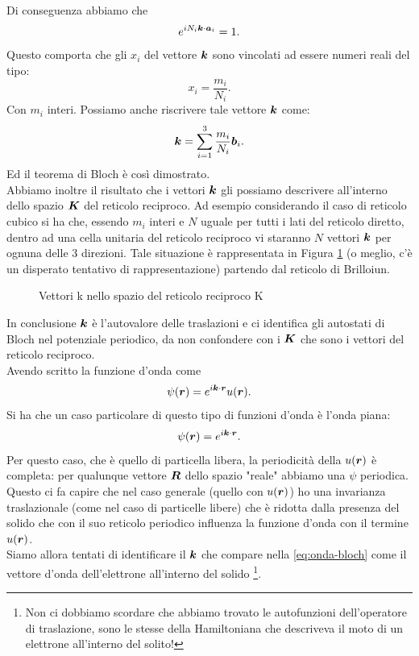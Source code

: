 Di conseguenza abbiamo che 
\[
	e^{iN_i\boldsymbol{k}\cdot\boldsymbol{a}_i}=1 
.\] 
Questo comporta che gli $x_i$ del vettore $\boldsymbol{k}$ sono vincolati ad essere numeri reali del tipo:
\[
	x_i = \frac{m_i}{N_i}
.\] 
Con $m_i$ interi. Possiamo anche riscrivere tale vettore $\boldsymbol{k}$ come:
\[
	\boldsymbol{k}=\sum_{i=1}^{3} \frac{m_i}{N_i}\boldsymbol{b}_i
.\] 
Ed il teorema di Bloch è così dimostrato.\\
Abbiamo inoltre il risultato che i vettori $\boldsymbol{k}$ gli possiamo descrivere all'interno dello spazio $\boldsymbol{K}$ del reticolo reciproco. Ad esempio considerando il caso di reticolo cubico si ha che, essendo $m_i$ interi e $N$ uguale per tutti i lati del reticolo diretto, dentro ad una cella unitaria del reticolo reciproco vi staranno $N$ vettori $\boldsymbol{k}$ per ognuna delle 3 direzioni. Tale situazione è rappresentata in Figura \ref{fig:vettori-k-nello-spazio-del-reticolo-reciproco-k} (o meglio, c'è un disperato tentativo di rappresentazione) partendo dal reticolo di Brilloiun.
\begin{figure}[ht]
    \centering
    \caption{Vettori k nello spazio del reticolo reciproco K}
    \label{fig:vettori-k-nello-spazio-del-reticolo-reciproco-k}
\end{figure}
In conclusione $\boldsymbol{k}$ è l'autovalore delle traslazioni e ci identifica gli autostati di Bloch nel potenziale periodico, da non confondere con i $\boldsymbol{K}$ che sono i vettori del reticolo reciproco.\\
Avendo scritto la funzione d'onda come
\[
	\psi(\boldsymbol{r})= e^{i\boldsymbol{k}\cdot\boldsymbol{r}}u(\boldsymbol{r}) \label{eq:onda-bloch}
.\] 
Si ha che un caso particolare di questo tipo di funzioni d'onda è l'onda piana:
\[
	\psi(\boldsymbol{r})=e^{i\boldsymbol{k}\cdot\boldsymbol{r}}
.\] 
Per questo caso, che è quello di particella libera, la periodicità della $u(\boldsymbol{r})$ è completa: per qualunque vettore $\boldsymbol{R}$ dello spazio "reale" abbiamo una $\psi$ periodica.\\
Questo ci fa capire che nel caso generale (quello con $u(\boldsymbol{r})$) ho una invarianza traslazionale (come nel caso di particelle libere) che è ridotta dalla presenza del solido che con il suo reticolo periodico influenza la funzione d'onda con il termine $u(\boldsymbol{r})$.\\
Siamo allora tentati di identificare il $\boldsymbol{k}$ che compare nella \ref{eq:onda-bloch} come il vettore d'onda dell'elettrone all'interno del solido \footnote{Non ci dobbiamo scordare che abbiamo trovato le autofunzioni dell'operatore di traslazione, sono le stesse della Hamiltoniana che descriveva il moto di un elettrone all'interno del solito!}.\\
